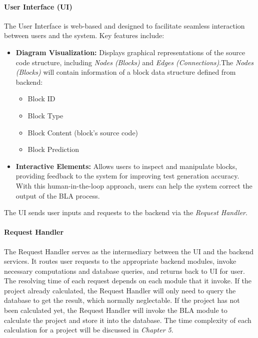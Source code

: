 \paragraph{User Interface (UI)}

\hspace{0.5cm}The User Interface is web-based and designed to facilitate seamless interaction between users and the system. Key features include:
\begin{itemize}
    \item \textbf{Diagram Visualization:} Displays graphical representations of the source code structure, including \textit{Nodes (Blocks)} and \textit{Edges (Connections)}.The \textit{Nodes (Blocks)} will contain information of a block data structure defined from backend: 
		\begin{itemize}
			\item Block ID
			\item Block Type
			\item Block Content (block's source code)
			\item Block Prediction
		\end{itemize}
    \item \textbf{Interactive Elements:} Allows users to inspect and manipulate blocks, providing feedback to the system for improving test generation accuracy. With this human-in-the-loop approach, users can help the system correct the output of the BLA process.
\end{itemize}

\hspace{0.5cm}The UI sends user inputs and requests to the backend via the \textit{Request Handler}.

\paragraph{Request Handler}

\hspace{0.5cm}The Request Handler serves as the intermediary between the UI and the backend services. It routes user requests to the appropriate backend modules, invoke necessary computations and database queries, and returns back to UI for user. The resolving time of each request depends on each module that it invoke. If the project already calculated, the Request Handler will only need to query the database to get the result, which normally neglectable. If the project has not been calculated yet, the Request Handler will invoke the BLA module to calculate the project and store it into the database. The time complexity of each calculation for a project will be discussed in \textit{Chapter 5}.

